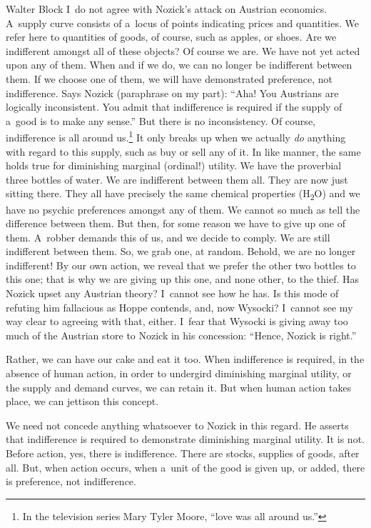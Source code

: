 \begin{artengenv}{Walter Block}
I~do not agree with Nozick's attack on Austrian economics. A~supply curve consists of a~locus of points indicating prices and quantities. We refer here to quantities of goods, of course, such as apples, or shoes. Are we indifferent amongst all of these objects? Of course we are. We have not yet acted upon any of them. When and if we do, we can no longer be indifferent between them. If we choose one of them, we will have demonstrated preference, not indifference. Says Nozick (paraphrase on my part): ``Aha! You Austrians are logically inconsistent. You admit that indifference is required if the supply of a~good is to make any sense.'' But there is no inconsistency. Of course, indifference is all around us.\footnote{In the television series Mary Tyler Moore, ``love was all around us.''} It only breaks up when we actually \textit{do} anything with regard to this supply, such as buy or sell any of it. In like manner, the same holds true for diminishing marginal (ordinal!) utility. We have the proverbial three bottles of water. We are indifferent between them all. They are now just sitting there. They all have precisely the same chemical properties (H\textsubscript{2}O) and we have no psychic preferences amongst any of them. We cannot so much as tell the difference between them. But then, for some reason we have to give up one of them. A~robber demands this of us, and we decide to comply. We are still indifferent between them. So, we grab one, at random. Behold, we are no longer indifferent! By our own action, we reveal that we prefer the other two bottles to this one; that is why we are giving up this one, and none other, to the thief. Has Nozick upset any Austrian theory? I~cannot see how he has. Is this mode of refuting him fallacious as Hoppe contends, and, now Wysocki? I~cannot see my way clear to agreeing with that, either. I~fear that Wysocki is giving away too much of the Austrian store to Nozick in his concession: ``Hence, Nozick is right.''

Rather, we can have our cake and eat it too. When indifference is required, in the absence of human action, in order to undergird diminishing marginal utility, or the supply and demand curves, we can retain it. But when human action takes place, we can jettison this concept.

We need not concede anything whatsoever to Nozick
\parencite*[][]{nozick_austrian_1977} %
 in this regard. He asserts that indifference is required to demonstrate diminishing marginal utility. It is not. Before action, yes, there is indifference. There are stocks, supplies of goods, after all. But, when action occurs, when a~unit of the good is given up, or added, there is preference, not indifference.


\end{artengenv}
